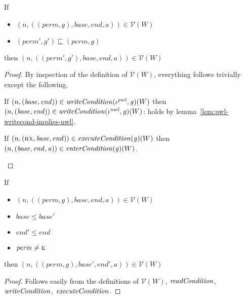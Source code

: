 \documentclass[a4paper]{article}
\newcommand{\var}[1]{\mathit{#1}}
\newcommand{\gl}{\var{g}}
\newcommand{\addr}{\var{a}}
\newcommand{\start}{\var{base}}
\newcommand{\addrend}{\var{end}}
\newcommand{\perm}{\var{perm}}
\newcommand{\nwl}{\var{nwl}}
\newcommand{\pwl}{\var{pwl}}
\newcommand{\plainfun}[2]{
  \ifthenelse{\equal{#2}{}}
  {\mathit{#1}}
  {\mathit{#1}(#2)}
}
\newcommand{\readCond}[1]{\plainfun{readCondition}{#1}}
\newcommand{\writeCond}[1]{\plainfun{writeCondition}{#1}}
\newcommand{\execCond}[1]{\plainfun{executeCondition}{#1}}
\newcommand{\entryCond}[1]{\plainfun{enterCondition}{#1}}
\newcommand{\asmType}{\plaindom{AsmType}}
\newcommand{\plaindom}[1]{\mathrm{#1}}
\newcommand{\intr}[2]{\mathcal{#1}}
\newcommand{\valueintr}[1]{\intr{V}{#1}}
\newcommand{\stdvr}{\valueintr{\asmType}}
\newcommand{\npair}[2][n]{\left(#1,#2 \right)}
\newcommand{\plainperm}[1]{\textsc{#1}}
\newcommand{\exec}{\plainperm{rx}}
\newcommand{\entry}{\plainperm{e}}
\begin{document}
 \begin{lemma}
   \label{lem:conds-restrict-suffice}
   If
   \begin{itemize}
   \item $\npair{((\perm,\gl),\start,\addrend,\addr)}\in\stdvr(W)$
   \item $(\perm',\gl')\sqsubseteq (\perm,\gl)$
   \end{itemize}
 
   then  $\npair{((\perm',\gl'),\start,\addrend,\addr)}\in \stdvr(W)$
 \end{lemma}
 \begin{proof}
   By inspection of the definition of $\stdvr(W)$, everything follows trivially
   except the following.

   \begin{enumproof}
   \item If $\npair{(\start,\addrend)} \in \writeCond{}(\iota^\pwl,\gl)(W)$ then
     $\npair{(\start,\addrend)} \in \writeCond{}(\iota^\nwl,\gl)(W)$: holds
     by lemma~\ref{lem:pwl-writecond-implies-nwl}.
   \item If $\npair{(\exec,\start,\addrend)} \in \execCond{}(\gl)(W)$ then
     $\npair{(\start,\addrend,\addr)} \in \entryCond{}(\gl)(W)$.
   \end{enumproof}
 \end{proof}
 
 \begin{lemma}
   \label{lem:conds-subseg-suffice}
   If
   \begin{itemize}
   \item $\npair{((\perm,\gl),\start,\addrend,\addr)} \in \stdvr(W)$
   \item $\start \leq \start'$
   \item $\addrend' \leq \addrend$
   \item $\perm \neq \entry$
   \end{itemize}
 
   then $\npair{((\perm,\gl),\start',\addrend',\addr)} \in \stdvr(W)$
 \end{lemma}
 \begin{proof}
   Follows easily from the definitions of $\stdvr(W)$, $\readCond{}$,
   $\writeCond{}$, $\execCond{}$.
 \end{proof}
 
\end{document}
